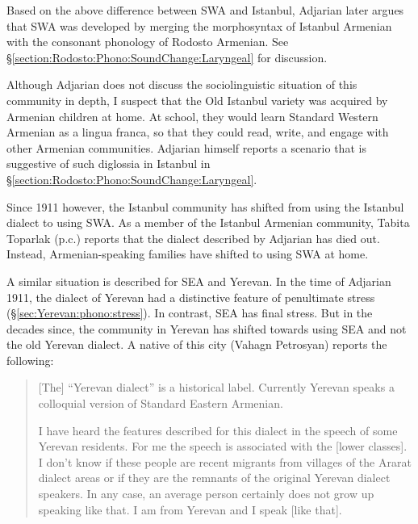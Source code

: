 Based on the above difference between SWA and Istanbul, Adjarian later argues that SWA was developed by merging the morphosyntax of Istanbul Armenian with the consonant phonology of Rodosto Armenian. See \S\ref{section:Rodosto:Phono:SoundChange:Laryngeal} for discussion. 

Although Adjarian does not discuss the sociolinguistic situation of this community in depth, I suspect that the Old Istanbul variety was acquired by Armenian children at home. At school, they would learn Standard Western Armenian  as a lingua franca, so that they could read, write, and engage with other Armenian communities. Adjarian himself reports a scenario that is suggestive of such diglossia in Istanbul in \S\ref{section:Rodosto:Phono:SoundChange:Laryngeal}. 



Since 1911 however, the Istanbul community has shifted from using the Istanbul dialect to using SWA. As a member of the Istanbul Armenian community, Tabita Toparlak (p.c.) reports that the dialect described by Adjarian has died out. Instead, Armenian-speaking families have shifted to using SWA at home. 




A similar situation is described for SEA and Yerevan. In the time of Adjarian 1911, the dialect of Yerevan had a distinctive feature of penultimate stress (\S\ref{sec:Yerevan:phono:stress}). In contrast, SEA has final stress. But in the decades since, the community in Yerevan has shifted towards using SEA and not the old Yerevan dialect. A native of this city (Vahagn Petrosyan) reports the following:

\begin{quote}
	[The] ``Yerevan dialect'' is a historical label. Currently Yerevan speaks a colloquial version of Standard Eastern Armenian.
	
	I have heard the features described for this dialect in the speech of some Yerevan residents. For me the speech is associated with the [lower classes]. I don't know if these people are recent migrants from villages of the Ararat dialect areas or if they are the remnants of the original Yerevan dialect speakers. In any case, an average person certainly does not grow up speaking like that. I am from Yerevan and I speak [like that]. 
\end{quote}


